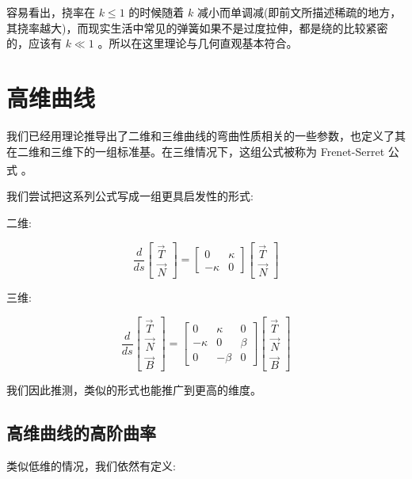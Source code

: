 \documentclass[fontset=windows]{article}
\newcommand{\upcite}[1]{\textsuperscript{\cite{#1}}}
\begin{document}
容易看出，挠率在 $k \le 1$ 的时候随着 $k$ 减小而单调减(即前文所描述稀疏的地方，其挠率越大)，而现实生活中常见的弹簧如果不是过度拉伸，都是绕的比较紧密的，应该有 $k \ll 1$ 。所以在这里理论与几何直观基本符合。

\section{高维曲线}

我们已经用理论推导出了二维和三维曲线的弯曲性质相关的一些参数，也定义了其在二维和三维下的一组标准基。在三维情况下，这组公式被称为 Frenet-Serret 公式 \upcite{ref3}。

我们尝试把这系列公式写成一组更具启发性的形式:

二维:

$$
\frac{d}{ds}
\begin{bmatrix}
    \vec{T} \\
    \vec{N}
\end{bmatrix} = 
\begin{bmatrix}
    0 & \kappa \\
    -\kappa & 0 
\end{bmatrix}
\begin{bmatrix}
    \vec{T}  \\
    \vec{N}
\end{bmatrix}
$$

三维:

$$
\frac{d}{ds}
\begin{bmatrix}
    \vec{T} \\
    \vec{N} \\
    \vec{B}
\end{bmatrix} = 
\begin{bmatrix}
    0 & \kappa & 0\\
    -\kappa & 0 & \beta \\
    0 & -\beta & 0
\end{bmatrix}
\begin{bmatrix}
    \vec{T}  \\
    \vec{N}  \\
    \vec{B} 
\end{bmatrix}
$$

我们因此推测，类似的形式也能推广到更高的维度。

\subsection{高维曲线的高阶曲率}

类似低维的情况，我们依然有定义:
\end{document}
